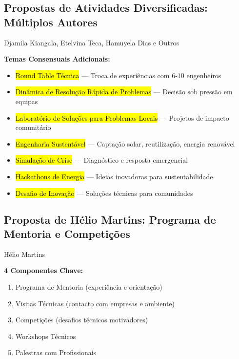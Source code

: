\documentclass[12pt,a4paper,oneside]{article}
\begin{document}
\vspace{1.2cm}

\subsection{Propostas de Atividades Diversificadas: Múltiplos Autores}

\begin{proposalbox}{Djamila Kiangala, Etelvina Teca, Hamuyela Dias e Outros}

\textbf{Temas Consensuais Adicionais:}

\begin{itemize}[label={\color{spe-secondary}▸}]
  \item \hl{Round Table Técnica} — Troca de experiências com 6-10 engenheiros
  \item \hl{Dinâmica de Resolução Rápida de Problemas} — Decisão sob pressão em equipas
  \item \hl{Laboratório de Soluções para Problemas Locais} — Projetos de impacto comunitário
  \item \hl{Engenharia Sustentável} — Captação solar, reutilização, energia renovável
  \item \hl{Simulação de Crise} — Diagnóstico e resposta emergencial
  \item \hl{Hackathons de Energia} — Ideias inovadoras para sustentabilidade
  \item \hl{Desafio de Inovação} — Soluções técnicas para comunidades
\end{itemize}

\end{proposalbox}

\vspace{1.2cm}

\subsection{Proposta de Hélio Martins: Programa de Mentoria e Competições}

\begin{proposalbox}{Hélio Martins}

\textbf{4 Componentes Chave:}
\begin{enumerate}
  \item Programa de Mentoria (experiência e orientação)
  \item Visitas Técnicas (contacto com empresas e ambiente)
  \item Competições (desafios técnicos motivadores)
  \item Workshops Técnicos
  \item Palestras com Profissionais
\end{enumerate}

\end{proposalbox}
\end{document}
